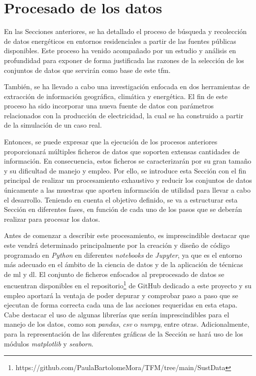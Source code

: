 \section{Procesado de los datos}
\label{sec:preprocesado}

En las Secciones anteriores, se ha detallado el proceso de búsqueda y recolección de datos energéticos en entornos residenciales a partir de las fuentes públicas disponibles. Este proceso ha venido acompañado por un estudio y análisis en profundidad para exponer de forma justificada las razones de la selección de los conjuntos de datos que servirán como base de este \gls{tfm}. 

\vspace{3mm}

También, se ha llevado a cabo una investigación enfocada en dos herramientas de extracción de información geográfica, climática y energética. El fin de este proceso ha sido incorporar una nueva fuente de datos con parámetros relacionados con la producción de electricidad, la cual se ha construido a partir de la simulación de un caso real.

\vspace{3mm}

Entonces, se puede expresar que la ejecución de los procesos anteriores proporcionará múltiples ficheros de datos que soporten extensas cantidades de información. En consecuencia, estos ficheros se caracterizarán por su gran tamaño y su dificultad de manejo y empleo. Por ello, se introduce esta Sección con el fin principal de realizar un procesamiento exhaustivo y reducir los conjuntos de datos únicamente a las muestras que aporten información de utilidad para llevar a cabo el desarrollo. Teniendo en cuenta el objetivo definido, se va a estructurar esta Sección en diferentes fases, en función de cada uno de los pasos que se deberán realizar para procesar los datos.

\vspace{3mm}

Antes de comenzar a describir este procesamiento, es imprescindible destacar que este vendrá determinado principalmente por la creación y diseño de código programado en \textit{Python} en diferentes \textit{notebooks} de \textit{Jupyter}, ya que es el entorno más adecuado en el ámbito de la ciencia de datos y de la aplicación de técnicas de \gls{ml} y \gls{dl}. El conjunto de ficheros enfocados al preprocesado de datos se encuentran disponibles en el repositorio\footnote{https://github.com/PaulaBartolomeMora/TFM/tree/main/SustData} de GitHub dedicado a este proyecto y su empleo aportará la ventaja de poder depurar y comprobar paso a paso que se ejecutan de forma correcta cada una de las acciones requeridas en esta etapa. Cabe destacar el uso de algunas librerías que serán imprescindibles para el manejo de los datos, como son \textit{pandas}, \textit{csv} o \textit{numpy}, entre otras. Adicionalmente, para la representación de las diferentes gráficas de la Sección se hará uso de los módulos \textit{matplotlib} y \textit{seaborn}. 

